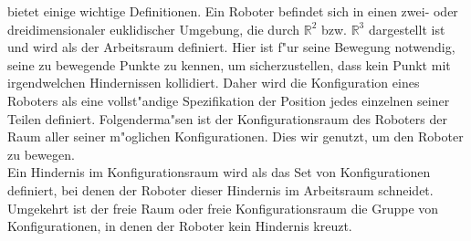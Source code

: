 %
%
%
\cite{Principles:05} bietet einige wichtige Definitionen. Ein Roboter befindet sich in einen zwei- oder dreidimensionaler euklidischer Umgebung, die durch $\mathbb{R}^{2}$ bzw. $\mathbb{R}^{3}$ dargestellt ist und wird als der Arbeitsraum definiert. Hier ist f"ur seine Bewegung notwendig, seine zu bewegende Punkte zu kennen, um sicherzustellen, dass kein Punkt mit irgendwelchen Hindernissen kollidiert. Daher wird die Konfiguration eines Roboters als eine vollst"andige Spezifikation der Position jedes einzelnen seiner Teilen definiert. Folgenderma{"s}en ist der Konfigurationsraum des Roboters der Raum aller seiner m"oglichen Konfigurationen. Dies wir genutzt, um den Roboter zu bewegen.\\
Ein Hindernis im Konfigurationsraum wird als das Set von Konfigurationen definiert, bei denen der Roboter dieser Hindernis im Arbeitsraum schneidet. Umgekehrt ist der freie Raum oder freie Konfigurationsraum die Gruppe von Konfigurationen, in denen der Roboter kein Hindernis kreuzt.


